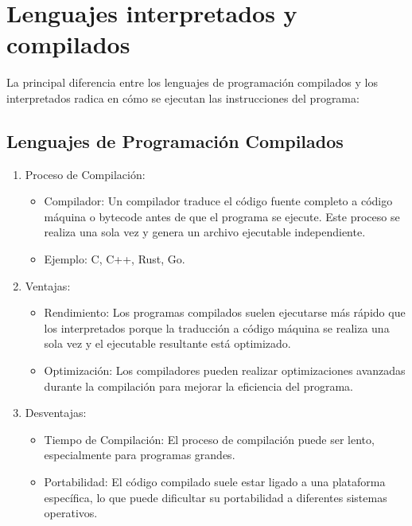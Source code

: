 \section{Lenguajes interpretados y compilados}\label{lenguajes-interpretados-y-compilados}

La principal diferencia entre los lenguajes de programación compilados y
los interpretados radica en cómo se ejecutan las instrucciones del
programa:

\subsection{Lenguajes de Programación Compilados}\label{lenguajes-de-programaciuxf3n-compilados}

\begin{enumerate}
  \item Proceso de Compilación: 
    \begin{itemize}
      \item
        Compilador: Un compilador traduce el código fuente completo a código
        máquina o bytecode antes de que el programa se ejecute. Este proceso
        se realiza una sola vez y genera un archivo ejecutable independiente.
      \item
        Ejemplo: C, C++, Rust, Go.
      \end{itemize}

  \item Ventajas:
      \begin{itemize}
        \item
          Rendimiento: Los programas compilados suelen ejecutarse más rápido que
          los interpretados porque la traducción a código máquina se realiza una
          sola vez y el ejecutable resultante está optimizado.
        \item
          Optimización: Los compiladores pueden realizar optimizaciones
          avanzadas durante la compilación para mejorar la eficiencia del
          programa.
      \end{itemize}

  \item Desventajas:
      \begin{itemize}
        \item
          Tiempo de Compilación: El proceso de compilación puede ser lento,
          especialmente para programas grandes.
        \item
          Portabilidad: El código compilado suele estar ligado a una plataforma
          específica, lo que puede dificultar su portabilidad a diferentes
          sistemas operativos.
      \end{itemize}
\end{enumerate}

